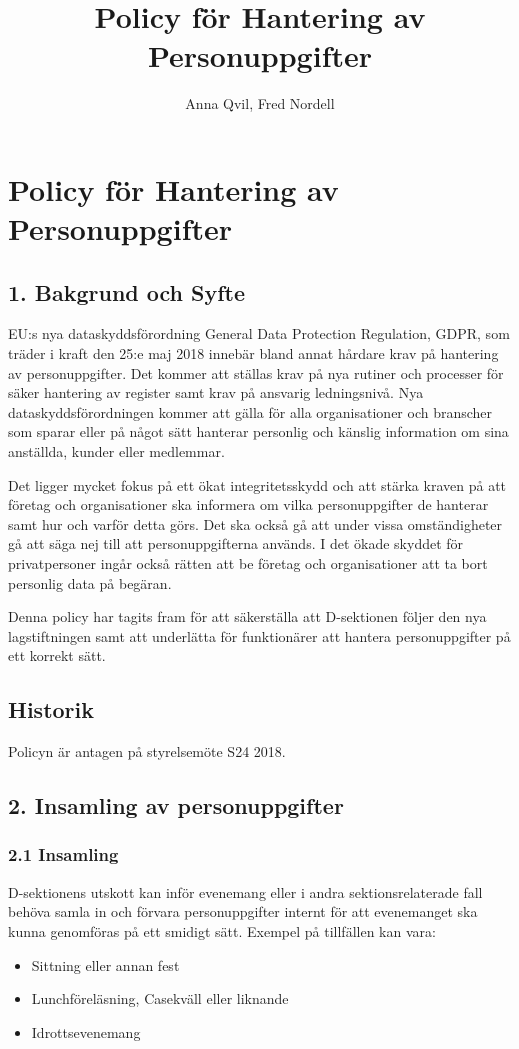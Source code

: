 \documentclass{dsekkallelse}
\title{Policy för Hantering av Personuppgifter}
\author{Anna Qvil, Fred Nordell}
\begin{document}
\section{Policy för Hantering av Personuppgifter}

\subsection{1. Bakgrund och Syfte}
EU:s nya dataskyddsförordning General Data Protection Regulation, GDPR, som träder i kraft den 25:e maj 2018 innebär bland annat hårdare krav på hantering av personuppgifter. Det kommer att ställas krav på nya rutiner och processer för säker hantering av register samt krav på ansvarig ledningsnivå. Nya dataskyddsförordningen kommer att gälla för alla organisationer och branscher som sparar eller på något sätt hanterar personlig och känslig information om sina anställda, kunder eller medlemmar.

\par Det ligger mycket fokus på ett ökat integritetsskydd och att stärka kraven på att företag och organisationer ska informera om vilka personuppgifter de hanterar samt hur och varför detta görs. Det ska också gå att under vissa omständigheter gå att säga nej till att personuppgifterna används. I det ökade skyddet för privatpersoner ingår också rätten att be företag och organisationer att ta bort personlig data på begäran.

Denna policy har tagits fram för att säkerställa att D-sektionen följer den nya lagstiftningen samt att underlätta för funktionärer att hantera personuppgifter på ett korrekt sätt.

\subsection{Historik}
Policyn är antagen på styrelsemöte S24 2018. 

\subsection{2. Insamling av personuppgifter}

\subsubsection{2.1 Insamling}
D-sektionens utskott kan inför evenemang eller i andra sektionsrelaterade fall behöva samla in och förvara personuppgifter internt för att evenemanget ska kunna genomföras på ett smidigt sätt. Exempel på tillfällen kan vara:
\begin{itemize}
\item Sittning eller annan fest 
\item Lunchföreläsning, Casekväll eller liknande
\item Idrottsevenemang 
\end{itemize}
\end{document}
